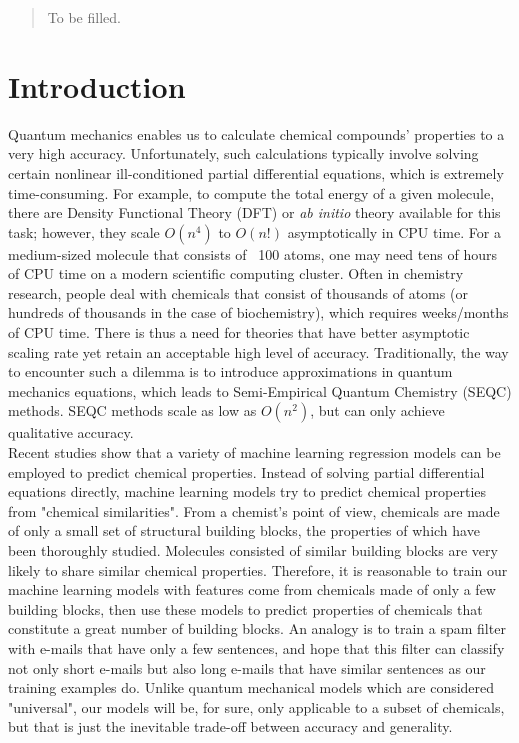 \begin{abstract}
To be filled.    
\end{abstract}
\section{Introduction}
\noindent Quantum mechanics enables us to calculate chemical compounds' properties to a very high accuracy. Unfortunately, such calculations typically involve solving certain nonlinear ill-conditioned partial differential equations, which is extremely time-consuming. For example, to compute the total energy of a given molecule, there are Density Functional Theory (DFT) or \textit{ab initio} theory available for this task; however, they scale $O(n^4)$ to $O(n!)$ asymptotically in CPU time. For a medium-sized molecule that consists of ~100 atoms, one may need tens of hours of CPU time on a modern scientific computing cluster. Often in chemistry research, people deal with chemicals that consist of thousands of atoms (or hundreds of thousands in the case of biochemistry), which requires weeks/months of CPU time. There is thus a need for theories that have better asymptotic scaling rate yet retain an acceptable high level of accuracy. Traditionally, the way to encounter such a dilemma is to introduce approximations in quantum mechanics equations, which leads to Semi-Empirical Quantum Chemistry (SEQC) methods. SEQC methods scale as low as $O(n^2)$, but can only achieve qualitative accuracy. \\

Recent studies show that a variety of machine learning regression models can be employed to predict chemical properties. Instead of solving partial differential equations directly, machine learning models try to predict chemical properties from "chemical similarities". From a chemist's point of view, chemicals are made of only a small set of structural building blocks, the properties of which have been thoroughly studied. Molecules consisted of similar building blocks are very likely to share similar chemical properties. Therefore, it is reasonable to train our machine learning models with features come from chemicals made of only a few building blocks, then use these models to predict properties of chemicals that constitute a great number of building blocks. An analogy is to train a spam filter with e-mails that have only a few sentences, and hope that this filter can classify not only short e-mails but also long e-mails that have similar sentences as our training examples do. Unlike quantum mechanical models which are considered "universal", our models will be, for sure, only applicable to a subset of chemicals, but that is just the inevitable trade-off between accuracy and generality. \\


